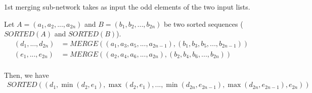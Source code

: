 
1st merging sub-network takes as input the odd elements of the two input lists.

\begin{prop}
Let $A=(a_1,a_2,...,a_{2n})$ and $B=(b_1,b_2,...,b_{2n})$ be two sorted sequences ($SORTED(A)$ and $SORTED(B)$).
\begin{align*}
(d_1, ..., d_{2n} ) & = MERGE((a_1, a_3, a_5, ..., a_{2n-1}), (b_1, b_3, b_5, ..., b_{2n-1}))\\
(e_1, ..., e_{2n} ) & = MERGE((a_2, a_4, a_6, ..., a_{2n}), (b_2, b_4, b_6, ..., b_{2n}))\\
\end{align*}

Then, we have
\begin{align*}
SORTED((d_1,\min (d_2,e_1),\max (d_2,e_1),..., \min (d_{2n}, e_{2n-1}), \max (d_{2n}, e_{2n-1}), e_{2n}))
\end{align*}
\end{prop}

